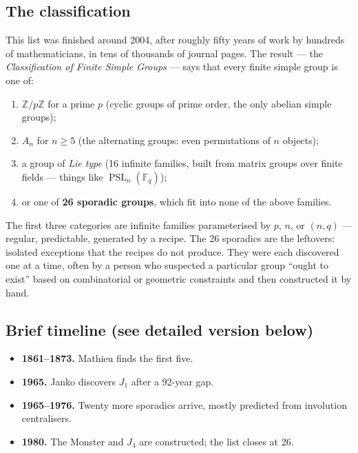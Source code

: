 \documentclass[11pt]{article}
\newcommand{\Z}{\mathbb{Z}}
\begin{document}
\subsection*{The classification}

This list was finished around 2004, after roughly fifty years of work
by hundreds of mathematicians, in tens of thousands of journal pages.
The result --- the \emph{Classification of Finite Simple Groups} ---
says that every finite simple group is one of:

\begin{enumerate}[leftmargin=*, itemsep=2pt]
  \item $\Z/p\Z$ for a prime $p$ (cyclic groups of prime order, the
        only abelian simple groups);
  \item $A_n$ for $n \ge 5$ (the alternating groups: even
        permutations of $n$ objects);
  \item a group of \emph{Lie type} (16 infinite families, built from
        matrix groups over finite fields --- things like
        $\operatorname{PSL}_n(\mathbb{F}_q)$);
  \item or one of \textbf{26 sporadic groups}, which fit into none of
        the above families.
\end{enumerate}

The first three categories are infinite families parameterised by
$p$, $n$, or $(n,q)$ --- regular, predictable, generated by a recipe.
The 26 sporadics are the leftovers: isolated exceptions that the
recipes do not produce. They were each discovered one at a time,
often by a person who suspected a particular group ``ought to exist''
based on combinatorial or geometric constraints and then constructed
it by hand.

\subsection*{Brief timeline (see detailed version below)}

\begin{itemize}[leftmargin=*, itemsep=2pt]
  \item \textbf{1861--1873.} Mathieu finds the first five.
  \item \textbf{1965.} Janko discovers $J_1$ after a 92-year gap.
  \item \textbf{1965--1976.} Twenty more sporadics arrive, mostly
        predicted from involution centralisers.
  \item \textbf{1980.} The Monster and $J_4$ are constructed; the
        list closes at 26.
\end{itemize}
\end{document}
